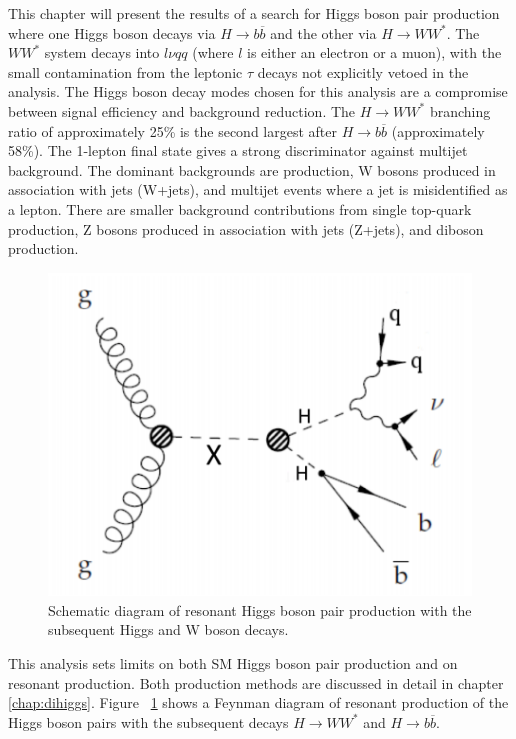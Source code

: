 This chapter will present the results of a search for Higgs boson pair production where one Higgs boson decays via ${H\rightarrow b\overline{b}}$ and the other via ${H\rightarrow WW^{*}}$. The ${WW^{*}}$ system decays into ${l\nu qq}$ (where ${l}$ is either an electron or a muon), with the small contamination from the leptonic ${\tau}$ decays not explicitly vetoed in the analysis. The Higgs boson decay modes chosen for this analysis are a compromise between signal efficiency and background reduction. The ${H\rightarrow WW^{*}}$ branching ratio of approximately 25\% is the second largest after ${H\rightarrow b\overline{b}}$ (approximately 58\%). The 1-lepton final state gives a strong discriminator against multijet background. The dominant backgrounds are \ttbar{} production, W bosons produced in association with jets (W+jets), and multijet events where a jet is misidentified as a lepton. There are smaller background  contributions from single top-quark production, Z bosons produced in association with jets (Z+jets), and diboson production.\newline

\begin{figure}[h]
\begin{center}
\includegraphics[scale=0.65]{figures/res_prod}
\caption[Schematic diagram of ${HH\rightarrow b\bar{b}WW^{*}\rightarrow b\bar{b}l\nu qq}$]{Schematic diagram of resonant Higgs boson pair production with the subsequent Higgs and W boson
decays.}
\label{fig:res}
\end{center}
\end{figure}

\indent This analysis sets limits on both SM Higgs boson pair production and on resonant production. Both production methods are discussed in detail in chapter \ref{chap:dihiggs}. Figure ~\ref{fig:res} shows a Feynman diagram of resonant production of the Higgs boson pairs with the subsequent decays ${H\rightarrow WW^{*}}$ and ${H\rightarrow b\overline{b}}$.
